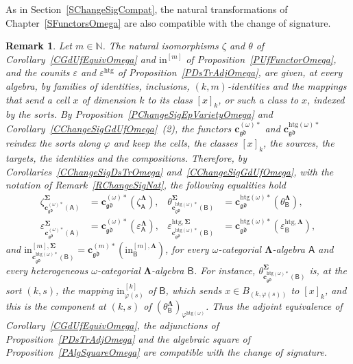 \documentclass[a4paper, reqno]{amsbook}
\newcommand{\sig}[1]{\mathbf{#1}}             %
\newcommand{\calg}[1]{\boldsymbol{\mathsf{#1}}} %
\newcommand{\gd}{\mathfrak{gd}}              %
\newcommand{\htg}{\mathrm{htg}}                %
\theoremstyle{plain}
\newtheorem{remark}[theorem]{Remark}
\theoremstyle{definition}
\begin{document}
As in Section~\ref{SChangeSigCompat}, the natural transformations of Chapter~\ref{SFunctorsOmega} are also compatible with the change of signature.

\begin{remark}\label{RChangeSigNatOmega}
Let $m\in\mathbb{N}$.
The natural isomorphisms $\zeta$ and $\theta$ of Corollary~\ref{CGdUfEquivOmega} and $\mathrm{in}^{[m]}$ of Proposition~\ref{PUfFunctorOmega}, and the counits $\varepsilon$ and $\varepsilon^{\htg}$ of Proposition~\ref{PDsTrAdjOmega}, are given, at every algebra, by families of identities, inclusions, $(k,m)$-identities and the mappings that send a cell $x$ of dimension $k$ to its class $[x]_{k}$, or such a class to $x$, indexed by the sorts.
By Proposition~\ref{PChangeSigEpVarietyOmega} and Corollary~\ref{CChangeSigGdUfOmega}~(2), the functors $\mathbf{c}^{(\omega)\ast}_{\gd}$ and $\mathbf{c}^{\htg(\omega)\ast}_{\gd}$ reindex the sorts along $\varphi$ and keep the cells, the classes $[x]_{k}$, the sources, the targets, the identities and the compositions.
Therefore, by Corollaries~\ref{CChangeSigDsTrOmega} and~\ref{CChangeSigGdUfOmega}, with the notation of Remark~\ref{RChangeSigNat}, the following equalities hold
\begin{align*}
\zeta^{\sig{\Sigma}}_{\mathbf{c}^{(\omega)\ast}_{\gd}(\calg{A})}&=\mathbf{c}^{(\omega)\ast}_{\gd}\left(\zeta^{\sig{\Lambda}}_{\calg{A}}\right),
&
\theta^{\sig{\Sigma}}_{\mathbf{c}^{\htg(\omega)\ast}_{\gd}(\calg{B})}&=\mathbf{c}^{\htg(\omega)\ast}_{\gd}\left(\theta^{\sig{\Lambda}}_{\calg{B}}\right),
\\
\varepsilon^{\sig{\Sigma}}_{\mathbf{c}^{(\omega)\ast}_{\gd}(\calg{A})}&=\mathbf{c}^{(\omega)\ast}_{\gd}\left(\varepsilon^{\sig{\Lambda}}_{\calg{A}}\right),
&
\varepsilon^{\htg,\sig{\Sigma}}_{\mathbf{c}^{\htg(\omega)\ast}_{\gd}(\calg{B})}&=\mathbf{c}^{\htg(\omega)\ast}_{\gd}\left(\varepsilon^{\htg,\sig{\Lambda}}_{\calg{B}}\right),
\end{align*}
and $\mathrm{in}^{[m],\sig{\Sigma}}_{\mathbf{c}^{\htg(\omega)\ast}_{\gd}(\calg{B})}=\mathbf{c}^{(m)\ast}_{\gd}(\mathrm{in}^{[m],\sig{\Lambda}}_{\calg{B}})$, for every $\omega$-categorial $\sig{\Lambda}$-algebra $\calg{A}$ and every heterogeneous $\omega$-categorial $\sig{\Lambda}$-algebra $\calg{B}$.
For instance, $\theta^{\sig{\Sigma}}_{\mathbf{c}^{\htg(\omega)\ast}_{\gd}(\calg{B})}$ is, at the sort $(k,s)$, the mapping $\mathrm{in}^{[k]}_{\varphi(s)}$ of $\calg{B}$, which sends $x\in B_{(k,\varphi(s))}$ to $[x]_{k}$, and this is the component at $(k,s)$ of $(\theta^{\sig{\Lambda}}_{\calg{B}})_{\varphi^{\htg(\omega)}}$.
Thus the adjoint equivalence of Corollary~\ref{CGdUfEquivOmega}, the adjunctions of Proposition~\ref{PDsTrAdjOmega} and the algebraic square of Proposition~\ref{PAlgSquareOmega} are compatible with the change of signature.
\end{remark}
\end{document}
